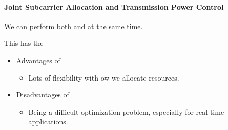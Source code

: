 \paragraph{Joint Subcarrier Allocation and Transmission Power Control}\label{par:Joint_Subcarrier_Transmission_Power}
We can perform both  and  at the same time.

This has the
\begin{itemize}[noitemsep]
\item Advantages of
  \begin{itemize}[noitemsep]
  \item Lots of flexibility with ow we allocate resources.
  \end{itemize}

\item Disadvantages of
  \begin{itemize}[noitemsep]
  \item Being a difficult optimization problem, especially for real-time applications.
  \end{itemize}
\end{itemize}

